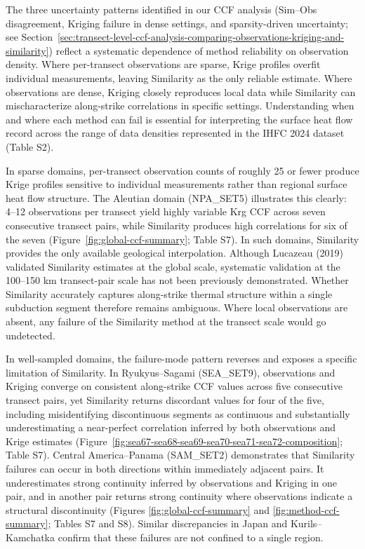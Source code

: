\documentclass[draft,linenumbers]{agujournal2019}
\begin{document}
The three uncertainty patterns identified in our CCF analysis (Sim--Obs
disagreement, Kriging failure in dense settings, and sparsity-driven
uncertainty; see
Section~\ref{sec:transect-level-ccf-analysis-comparing-observations-kriging-and-similarity})
reflect a systematic dependence of method reliability on observation
density. Where per-transect observations are sparse, Krige profiles
overfit individual measurements, leaving Similarity as the only reliable
estimate. Where observations are dense, Kriging closely reproduces local
data while Similarity can mischaracterize along-strike correlations in
specific settings. Understanding when and where each method can fail is
essential for interpreting the surface heat flow record across the range
of data densities represented in the IHFC 2024 dataset (Table S2).

In sparse domains, per-transect observation counts of roughly 25 or
fewer produce Krige profiles sensitive to individual measurements rather
than regional surface heat flow structure. The Aleutian domain
(NPA\_SET5) illustrates this clearly: 4--12 observations per transect
yield highly variable Krg CCF across seven consecutive transect pairs,
while Similarity produces high correlations for six of the seven
(Figure~\ref{fig:global-ccf-summary}; Table S7). In such domains,
Similarity provides the only available geological interpolation.
Although Lucazeau (2019) validated Similarity estimates at the global
scale, systematic validation at the 100--150 km transect-pair scale has
not been previously demonstrated. Whether Similarity accurately captures
along-strike thermal structure within a single subduction segment
therefore remains ambiguous. Where local observations are absent, any
failure of the Similarity method at the transect scale would go
undetected.

In well-sampled domains, the failure-mode pattern reverses and exposes a
specific limitation of Similarity. In Ryukyus--Sagami (SEA\_SET9),
observations and Kriging converge on consistent along-strike CCF values
across five consecutive transect pairs, yet Similarity returns
discordant values for four of the five, including misidentifying
discontinuous segments as continuous and substantially underestimating a
near-perfect correlation inferred by both observations and Krige
estimates
(Figure~\ref{fig:sea67-sea68-sea69-sea70-sea71-sea72-composition}; Table
S7). Central America--Panama (SAM\_SET2) demonstrates that Similarity
failures can occur in both directions within immediately adjacent pairs.
It underestimates strong continuity inferred by observations and Kriging
in one pair, and in another pair returns strong continuity where
observations indicate a structural discontinuity (Figures
\ref{fig:global-ccf-summary} and \ref{fig:method-ccf-summary}; Tables S7
and S8). Similar discrepancies in Japan and Kurils--Kamchatka confirm
that these failures are not confined to a single region.
\end{document}
